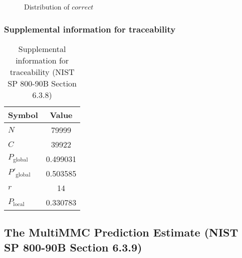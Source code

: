 \documentclass[a3paper,xelatex,english]{bxjsarticle}
\begin{document}
\begin{figure}[htbp]
\centering

\caption{Distribution of $correct$}
\end{figure}
\subsubsection{Supplemental information for traceability}
\renewcommand{\arraystretch}{1.8}
\begin{table}[h]
\caption{Supplemental information for traceability (NIST SP 800-90B Section 6.3.8)}
\begin{center}
\begin{tabular}{|l|c|}
\hline 
\rowcolor{anotherlightblue} %
Symbol				& Value \\ \hline 
$N$				& 79999\\ \hline 
$C$				& 39922\\ \hline 
$P_{\textrm{global}}$				& 0.499031\\ \hline 
$P'_{\textrm{global}}$			& 0.503585\\ \hline 
$r$				& 14\\ \hline 
$P_{\textrm{local}}$ 			& 0.330783\\ \hline
\end{tabular}
\end{center}
\end{table}
\renewcommand{\arraystretch}{1.4}
\clearpage
\subsection{The MultiMMC Prediction Estimate (NIST SP 800-90B Section 6.3.9)}\label{sec:Binary639}
\end{document}
